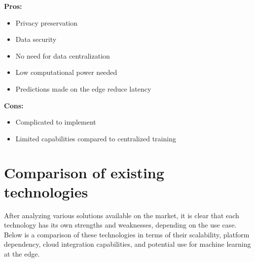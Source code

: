 \textbf{Pros:}
\begin{itemize}
    \item Privacy preservation
    \item Data security
    \item No need for data centralization
    \item Low computational power needed
    \item Predictions made on the edge reduce latency
\end{itemize}
\textbf{Cons:}
\begin{itemize}
    \item Complicated to implement
    \item Limited capabilities compared to centralized training
\end{itemize}


\section{Comparison of existing technologies}
After analyzing various solutions available on the market, it is clear that each technology has its own strengths and weaknesses, depending on the use case. Below is a comparison of these technologies in terms of their scalability, platform dependency, cloud integration capabilities, and potential use for machine learning at the edge.

